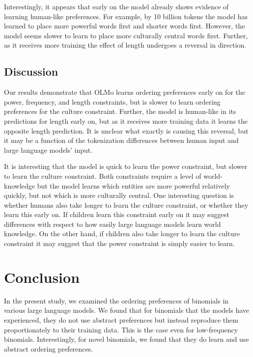 \documentclass[
  12pt,
  letterpaper,
]{scrreprt}
\begin{document}
Interestingly, it appears that early on the model already shows evidence
of learning human-like preferences. For example, by 10 billion tokens
the model has learned to place more powerful words first and shorter
words first. However, the model seems slower to learn to place more
culturally central words first. Further, as it receives more training
the effect of length undergoes a reversal in direction.

\subsection{Discussion}\label{discussion-7}

Our results demonstrate that OLMo learns ordering preferences early on
for the power, frequency, and length constraints, but is slower to learn
ordering preferences for the culture constraint. Further, the model is
human-like in its predictions for length early on, but as it receives
more training data it learns the opposite length prediction. It is
unclear what exactly is causing this reversal, but it may be a function
of the tokenization differences between human input and large language
models' input.

It is interesting that the model is quick to learn the power constraint,
but slower to learn the culture constraint. Both constraints require a
level of world-knowledge but the model learns which entities are more
powerful relatively quickly, but not which is more culturally central.
One interesting question is whether humans also take longer to learn the
culture constraint, or whether they learn this early on. If children
learn this constraint early on it may suggest differences with respect
to how easily large language models learn world knowledge. On the other
hand, if children also take longer to learn the culture constraint it
may suggest that the power constraint is simply easier to learn.

\section{Conclusion}\label{conclusion-1}

In the present study, we examined the ordering preferences of binomials
in various large language models. We found that for binomials that the
models have experienced, they do not use abstract preferences but
instead reproduce them proportionately to their training data. This is
the case even for low-frequency binomials. Interestingly, for novel
binomials, we found that they do learn and use abstract ordering
preferences.
\end{document}

